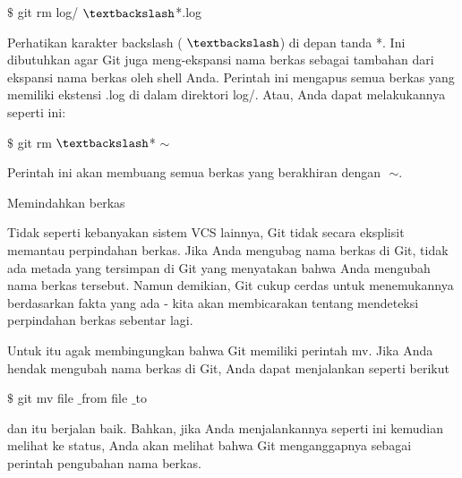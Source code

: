 \noindent 
{\fontsize{14pt}{14pt}\selectfont  $  \$  $ git rm log/ $  \textbackslash  $*.log \\} \par
\noindent 
{\fontsize{14pt}{14pt}\selectfont Perhatikan karakter backslash ( $  \textbackslash  $) di depan tanda $  $*. Ini dibutuhkan agar Git juga meng-ekspansi nama berkas sebagai tambahan dari ekspansi nama berkas oleh shell Anda. Perintah ini mengapus semua berkas yang memiliki ekstensi $  $.log $  $di dalam direktori $  $log/. Atau, Anda dapat melakukannya seperti ini: \\} \par
\noindent 
{\fontsize{14pt}{14pt}\selectfont  $  \$  $ git rm  $  \textbackslash  $* $  \sim  $ \\} \par
\noindent 
{\fontsize{14pt}{14pt}\selectfont Perintah ini akan membuang semua berkas yang berakhiran dengan $  $ $  \sim  $. \\} \par
\vspace{14pt}
\noindent 
{\fontsize{14pt}{14pt}\selectfont Memindahkan berkas \\} \par
\noindent 
{\fontsize{14pt}{14pt}\selectfont Tidak seperti kebanyakan sistem VCS lainnya, Git tidak secara eksplisit memantau perpindahan berkas. Jika Anda mengubag nama berkas di Git, tidak ada metada yang tersimpan di Git yang menyatakan bahwa Anda mengubah nama berkas tersebut. Namun demikian, Git cukup cerdas untuk menemukannya berdasarkan fakta yang ada - kita akan membicarakan tentang mendeteksi perpindahan berkas sebentar lagi. \\} \par
\noindent 
{\fontsize{14pt}{14pt}\selectfont Untuk itu agak membingungkan bahwa Git memiliki perintah $  $mv. Jika Anda hendak mengubah nama berkas di Git, Anda dapat menjalankan seperti berikut \\} \par
\vspace{14pt}
\noindent 
{\fontsize{14pt}{14pt}\selectfont  $  \$  $ git mv file $  \_  $from file $  \_  $to \\} \par
\noindent 
{\fontsize{14pt}{14pt}\selectfont dan itu berjalan baik. Bahkan, jika Anda menjalankannya seperti ini kemudian melihat ke status, Anda akan melihat bahwa Git menganggapnya sebagai perintah pengubahan nama berkas. \\} \par
